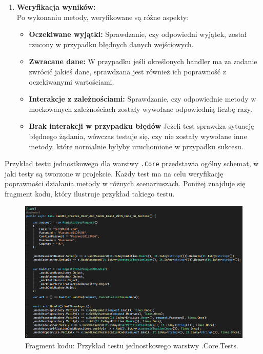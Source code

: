 \documentclass[12pt,a4paper]{article}
\begin{document}
\begin{enumerate}
    \item \textbf{Weryfikacja wyników:} \\
    Po wykonaniu metody, weryfikowane są różne aspekty:

    \begin{itemize}
        \item \textbf{Oczekiwane wyjątki:} Sprawdzanie, czy odpowiedni wyjątek, został rzucony w przypadku błędnych danych wejściowych.
        \item \textbf{Zwracane dane:} W przypadku jeśli określonych handler ma za zadanie zwrócić jakieś dane, sprawdzana jest również ich poprawność z oczekiwanymi wartościami.
        \item \textbf{Interakcje z zależnościami:} Sprawdzanie, czy odpowiednie metody w mockowanych zależnościach zostały wywołane odpowiednią liczbę razy.
        \item \textbf{Brak interakcji w przypadku błędów} Jeżeli test sprawdza sytuację błędnego żądania, wówczas testuje się, czy nie zostały wywołane inne metody, które normalnie byłyby uruchomione w przypadku sukcesu.
    \end{itemize}

\end{enumerate}

\newpage

\noindent
Przykład testu jednostkowego dla warstwy \texttt{.Core} przedstawia ogólny schemat, w jaki testy są tworzone w projekcie. Każdy test ma na celu weryfikację poprawności działania metody w różnych scenariuszach. Poniżej znajduje się fragment kodu, który ilustruje przykład takiego testu.

\vspace{0.5cm}
\begin{figure}[h!]
    \centering
    \includegraphics[width=1\textwidth]{images/ex_core_test.png}
    \caption{Fragment kodu: Przykład testu jednostkowego warstwy .Core.Tests.}
\end{figure}
\vspace{0.5cm}
\end{document}
